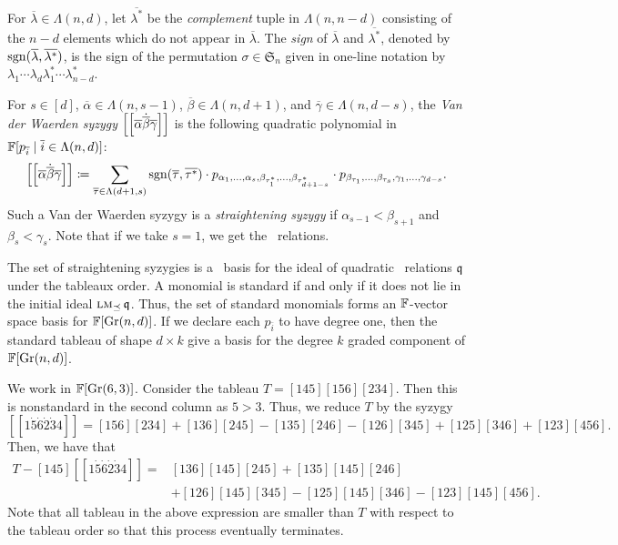 \documentclass[letterpaper, 11pt]{amsart}
\begin{document}
\begin{defn}
  For $\overline{\lambda} \in \Lambda(n, d)$, let $\overline{\lambda^*}$ be the \emph{complement} tuple in $\Lambda(n, n - d)$ consisting of the $n - d$ elements which do not appear in $\overline{\lambda}$.
  The \emph{sign} of $\overline{\lambda}$ and $\overline{\lambda^*}$, denoted by $\operatorname{sgn}(\overline{\lambda}, \overline{\lambda^*})$, is the sign of the permutation $\sigma \in \mathfrak{S}_n$ given in one-line notation by $\lambda_1 \cdots \lambda_d \lambda^*_1 \cdots \lambda^*_{n - d}$.

  For $s \in [d]$, $\overline{\alpha} \in \Lambda(n, s - 1)$, $\overline{\beta} \in \Lambda(n, d + 1)$, and $\overline{\gamma} \in \Lambda(n, d -s)$, the \emph{Van der Waerden syzygy} $\bqty{\bqty{\overline{\alpha} \dot{\overline{\beta}} \overline{\gamma}}}$ is the following quadratic polynomial in $\mathbb{F}[p_{\overline{i}} \mid \overline{i} \in \Lambda(n, d)]$:
  \[
    \bqty{\bqty{\overline{\alpha} \dot{\overline{\beta}} \overline{\gamma}}} \defeq \sum_{\overline{\tau} \in \Lambda(d + 1, s)} \sgn(\overline{\tau}, \overline{\tau^*}) \cdot p_{\alpha_1, \ldots, \alpha_s, \beta_{\tau^*_1}, \ldots, \beta_{\tau^*_{d + 1 - s}}} \cdot p_{\beta_{\tau_1}, \ldots, \beta_{\tau_s}, \gamma_1, \ldots, \gamma_{d - s}}.
  \]
  Such a Van der Waerden syzygy is a \emph{straightening syzygy} if $\alpha_{s - 1} < \beta_{s + 1}$ and $\beta_s < \gamma_s$.
  Note that if we take $s = 1$, we get the \Plucker\ relations.
\end{defn}

\begin{thrm}
  The set of straightening syzygies is a \Grobner\ basis for the ideal of quadratic \Plucker\ relations $\mathfrak{q}$ under the tableaux order.
  A monomial is standard if and only if it does not lie in the initial ideal $\operatorname{\textsc{lm}}_{\preceq}{\mathfrak{q}}$.
  Thus, the set of standard monomials forms an $\mathbb{F}$-vector space basis for $\mathbb{F}[\operatorname{Gr}(n, d)]$.
  If we declare each $p_{\overline{i}}$ to have degree one, then the standard tableau of shape $d \times k$ give a basis for the degree $k$ graded component of $\mathbb{F}[\operatorname{Gr}(n, d)]$.
\end{thrm}

\begin{ex}
  We work in $\mathbb{F}[\operatorname{Gr}(6, 3)]$.
  Consider the tableau $T = [1 4 5][1 5 6][2 3 4]$.
  Then this is nonstandard in the second column as $5 > 3$.
  Thus, we reduce $T$ by the syzygy
  \[
    [[1 \dot{5} \dot{6} \dot{2} \dot{3} 4]] = [1 5 6][2 3 4] + [1 3 6][2 4 5] - [1 3 5][2 4 6] - [1 2 6][3 4 5] + [1 2 5][3 4 6] + [1 2 3][4 5 6].
  \]
  Then, we have that
  \begin{align*}
    T - [1 4 5] [[1 \dot{5} \dot{6} \dot{2} \dot{3} 4]] =& [1 3 6][1 4 5][2 4 5] + [1 3 5][1 4 5][2 4 6] \\
    &+ [1 2 6][1 4 5][3 4 5] - [1 2 5][1 4 5][3 4 6] - [1 2 3][1 4 5][4 5 6].
  \end{align*}
  Note that all tableau in the above expression are smaller than $T$ with respect to the tableau order so that this process eventually terminates.
\end{ex}
\end{document}
